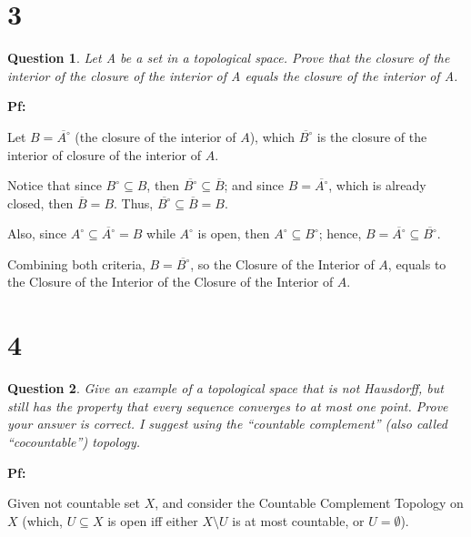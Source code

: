 \documentclass{article}
\newtheorem{question}{Question}
\begin{document}
\break

\section*{3}
\begin{myBox}[]{}
    \begin{question}
        Let A be a set in a topological space. Prove that the closure of the interior of
        the closure of the interior of A equals the closure of the interior of A.
    \end{question}
\end{myBox}

\textbf{Pf:}

Let $B=\overline{A^\circ}$ (the closure of the interior of $A$), which $\overline{B^\circ}$ is the closure of the interior of closure of the interior of $A$.

Notice that since $B^\circ \subseteq B$, then $\overline{B^\circ}\subseteq \overline{B}$; and since $B=\overline{A^\circ}$, which is already closed, then $\overline{B}=B$.
Thus, $\overline{B^\circ}\subseteq \overline{B}=B$.

\hfill

Also, since $A^\circ \subseteq \overline{A^\circ}=B$ while $A^\circ$ is open, then $A^\circ \subseteq B^\circ$; hence, $B=\overline{A^\circ}\subseteq \overline{B^\circ}$.

\hfill

Combining both criteria, $B=\overline{B^\circ}$, so the Closure of the Interior of $A$, equals to the Closure of the Interior of the Closure of the Interior of $A$.

\hfill

\hfill

\section*{4}
\begin{myBox}[]{}
    \begin{question}
        Give an example of a topological space that is not Hausdorff, but still has
        the property that every sequence converges to at most one point. Prove your
        answer is correct. I suggest using the “countable complement” (also called
        “cocountable”) topology.
    \end{question}
\end{myBox}

\textbf{Pf:}

Given not countable set $X$, and consider the Countable Complement Topology on $X$ (which, $U\subseteq X$ is open iff either $X\setminus U$ is at most countable, or $U=\emptyset$).
\end{document}
